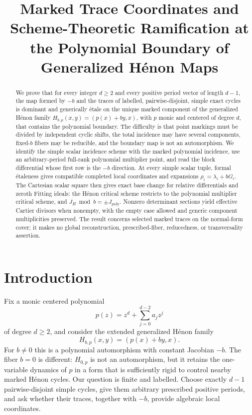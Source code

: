 \documentclass[11pt]{article}
\title{Marked Trace Coordinates and Scheme-Theoretic Ramification at the Polynomial Boundary of Generalized Hénon Maps}
\author{}
\date{}
\theoremstyle{definition}
\theoremstyle{remark}
\begin{document}
\maketitle

\begin{abstract}
We prove that for every integer $d\ge 2$ and every positive period vector of length $d-1$, the map formed by $-b$ and the traces of labelled, pairwise-disjoint, simple exact cycles is dominant and generically étale on the unique marked component of the generalized Hénon family $H_{b,p}(x,y)=(p(x)+by,x)$, with $p$ monic and centered of degree $d$, that contains the polynomial boundary. The difficulty is that point markings must be divided by independent cyclic shifts, the total incidence may have several components, fixed-$b$ fibers may be reducible, and the boundary map is not an automorphism. We identify the simple scalar incidence scheme with the marked polynomial incidence, use an arbitrary-period full-rank polynomial multiplier point, and read the block differential whose first row is the $-b$ direction. At every simple scalar tuple, formal étaleness gives compatible completed local coordinates and expansions $\rho_i=\lambda_i+bG_i$. The Cartesian scalar square then gives exact base change for relative differentials and zeroth Fitting ideals: the Hénon critical scheme restricts to the polynomial multiplier critical scheme, and $J_H\bmod b=\pm J_{\mathrm{poly}}$. Nonzero determinant sections yield effective Cartier divisors when nonempty, with the empty case allowed and generic component multiplicities preserved. The result concerns selected marked traces on the normal-form cover; it makes no global reconstruction, prescribed-fiber, reducedness, or transversality assertion.
\end{abstract}

\section{Introduction}
\label{sec:introduction}

Fix a monic centered polynomial
\[
  p(z)=z^d+\sum_{j=0}^{d-2}a_jz^j
\]
of degree $d\geq 2$, and consider the extended generalized Hénon family
\[
  H_{b,p}(x,y)=(p(x)+by,x).
\]
For $b\neq 0$ this is a polynomial automorphism with constant Jacobian
$-b$.  The fiber $b=0$ is different: $H_{0,p}$ is not an automorphism, but
it retains the one-variable dynamics of $p$ in a form that is sufficiently
rigid to control nearby marked Hénon cycles.  Our question is finite and
labelled.  Choose exactly $d-1$ pairwise-disjoint simple cycles, give them
arbitrary prescribed positive periods, and ask whether their traces,
together with $-b$, provide algebraic local coordinates.
\end{document}
